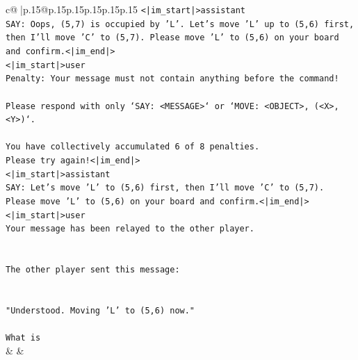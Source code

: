 \documentclass{article}
\begin{document}
{\begin{supertabular}{c@{$\;$}|p{.15\linewidth}@{}p{.15\linewidth}p{.15\linewidth}p{.15\linewidth}p{.15\linewidth}p{.15\linewidth}}
{{{\texttt{<|im\_start|>assistant} \\
\texttt{SAY: Oops, (5,7) is occupied by 'L'. Let's move 'L' up to (5,6) first, then I'll move 'C' to (5,7). Please move 'L' to (5,6) on your board and confirm.<|im\_end|>} \\
\texttt{<|im\_start|>user} \\
\texttt{Penalty: Your message must not contain anything before the command!} \\
\\ 
\texttt{Please respond with only `SAY: <MESSAGE>` or `MOVE: <OBJECT>, (<X>, <Y>)`.} \\
\\ 
\texttt{You have collectively accumulated 6 of 8 penalties.} \\
\texttt{Please try again!<|im\_end|>} \\
\texttt{<|im\_start|>assistant} \\
\texttt{SAY: Let's move 'L' to (5,6) first, then I'll move 'C' to (5,7). Please move 'L' to (5,6) on your board and confirm.<|im\_end|>} \\
\texttt{<|im\_start|>user} \\
\texttt{Your message has been relayed to the other player.} \\
\\ 
\\ 
\texttt{The other player sent this message:} \\
\\ 
\\ 
\texttt{"Understood. Moving 'L' to (5,6) now."} \\
\\ 
\texttt{What is} \\
            }
        }
    }
    & & \\ \\


\end{supertabular}}
\end{document}

